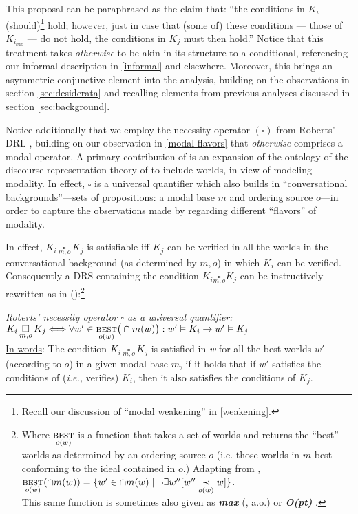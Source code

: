 This proposal can be paraphrased as the claim that: ``the conditions in $K_i$ (should)\footnote{Recall our discussion of ``modal weakening'' in \ref{weakening}.} hold; however, just in case that (some of) these conditions --- those of $K_{i_{\text{sub}}}$ --- do not hold, the conditions in $K_j$ must then hold.'' Notice that this treatment takes \textit{otherwise} to be akin in its structure to a conditional, referencing our informal description in \ref{informal} and elsewhere. Moreover, this brings an asymmetric conjunctive element into the analysis, building on the observations in section \ref{sec:desiderata} and recalling elements from previous analyses discussed in section \ref{sec:background}.%

Notice additionally that we employ the necessity operator $ (\square) $ from Roberts' DRL \citeyearpar[695, 715]{Roberts1989}, building on our observation in \ref{modal-flavors} that \textit{otherwise} comprises a modal operator. A primary contribution of \citealt{Roberts1989} is an expansion of the ontology of the discourse representation theory of \citealt{Kamp1981} to include worlds, in view of modeling modality. In effect, $ \square$ is a universal quantifier which also builds in ``conversational backgrounds''---sets of propositions: a modal base $ m $ and ordering source $ o $---in order to capture the observations made by \citet[\S2.7]{Kratzer1981} regarding different ``flavors'' of modality. 

In effect, $K_i\,\underset{m,o}{\square}\,K_j$ is satisfiable iff $ K_j $ can be verified in all the worlds in the conversational background (as determined by $ m,o $) in which $ K_i $ can be verified. Consequently a DRS containing the condition $ K_i\underset{m,o}{\square}K_j $ can be instructively rewritten as in (\nextx):\footnote{Where $ \underset{o(w)}{\textsc{best}}$ is a function that takes a set of worlds and returns the ``best'' worlds as determined by an ordering source $ o $ (i.e. those worlds in $ m $ best conforming to the ideal contained in $ o $.) Adapting from \citet{VonFintel2011}, $ \underset{o(w)}{\textsc{best}}(\cap m(w))=\{w'\in\cap m(w)\mid \neg\exists w''[w''\underset{o(w)}{\prec}w]\}$.\\This same function is sometimes also given as \textbf{\textit{max}} (\citealp[e.g.][]{Hacquard2006,VonFintel2008,VonFintel2011}, a.o.) or \textbf{\textit{O(pt)}} \citep[247]{Schwager2006}.\label{ord-source}}

\pex \label{modal-quant}\emph{Roberts' necessity operator $ \square $ as a universal quantifier:\\} 
$K_i\,\underset{m,o}{\square}\,K_j \Longleftrightarrow\forall w'\in\underset{o(w)}{\textsc{best}}\big(\cap m(w)\big):w'\vDash K_i \rightarrow w'\vDash K_j$\\[6pt]
\underline{In words}: The condition $K_i\,\underset{m,o}{\square}\,K_j$ is satisfied in \textit{w} for all the best worlds $w'$ (according to $ o $) in a given modal base $ m $, if it holds that if $w'$ satisfies the conditions of (\textit{i.e.,} verifies) $ K_i $, then it also satisfies the conditions of $ K_j $.\xe


